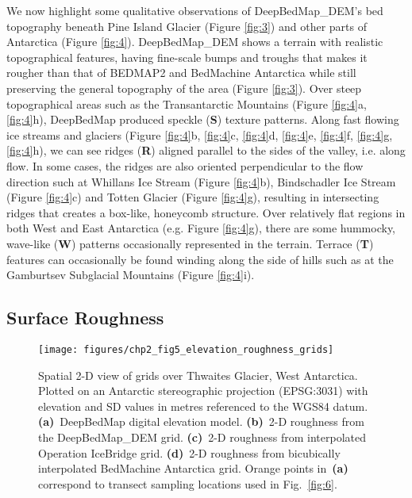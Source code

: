 We now highlight some qualitative observations of DeepBedMap\_DEM's bed topography beneath Pine Island Glacier (Figure \ref{fig:3}) and other parts of Antarctica (Figure \ref{fig:4}).
DeepBedMap\_DEM shows a terrain with realistic topographical features, having fine-scale bumps and troughs that makes it rougher than that of BEDMAP2 \citep{FretwellBedmap2improvedice2013} and BedMachine Antarctica \citep{MorlighemMEaSUREsBedMachineAntarctica2019} while still preserving the general topography of the area (Figure \ref{fig:3}).
Over steep topographical areas such as the Transantarctic Mountains (Figure \ref{fig:4}a, \ref{fig:4}h), DeepBedMap produced speckle (\textbf{S}) texture patterns.
Along fast flowing ice streams and glaciers (Figure \ref{fig:4}b, \ref{fig:4}c, \ref{fig:4}d, \ref{fig:4}e, \ref{fig:4}f, \ref{fig:4}g, \ref{fig:4}h), we can see ridges (\textbf{R}) aligned parallel to the sides of the valley, i.e. along flow.
In some cases, the ridges are also oriented perpendicular to the flow direction such at Whillans Ice Stream (Figure \ref{fig:4}b), Bindschadler Ice Stream (Figure \ref{fig:4}c) and Totten Glacier (Figure \ref{fig:4}g), resulting in intersecting ridges that creates a box-like, honeycomb structure.
Over relatively flat regions in both West and East Antarctica (e.g. Figure \ref{fig:4}g), there are some hummocky, wave-like (\textbf{W}) patterns occasionally represented in the terrain.
Terrace (\textbf{T}) features can occasionally be found winding along the side of hills such as at the Gamburtsev Subglacial Mountains (Figure \ref{fig:4}i).


\subsection{Surface Roughness} \label{section:surfaceroughness}

\begin{figure*}[htbp]
  \texttt{[image: figures/chp2\_fig5\_elevation\_roughness\_grids]}
  \caption[Spatial 2-D view of bed elevation and roughness grids over Thwaites Glacier]{
    Spatial 2-D view of grids over Thwaites Glacier, West Antarctica.
    Plotted on an Antarctic stereographic projection (EPSG:3031) with elevation and SD values in metres referenced to the WGS84 datum.
    \textbf{(a)}~DeepBedMap digital elevation model.
    \textbf{(b)}~2-D roughness from the DeepBedMap\_DEM grid.
    \textbf{(c)}~2-D roughness from interpolated Operation IceBridge grid.
    \textbf{(d)}~2-D roughness from bicubically interpolated BedMachine Antarctica grid.
    Orange points in~\textbf{(a)} correspond to transect sampling locations used in Fig.~\ref{fig:6}.
  }
  \label{fig:5}
\end{figure*}

